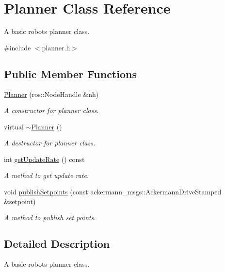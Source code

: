 \hypertarget{classPlanner}{}\section{Planner Class Reference}
\label{classPlanner}


A basic robot\textquotesingle{}s planner class.  




{\ttfamily \#include $<$planner.\+h$>$}

\subsection*{Public Member Functions}
\begin{DoxyCompactItemize}
\item 
\hyperlink{classPlanner_a32475baddd401921adb1aab3ab842210}{Planner} (ros\+::\+Node\+Handle \&nh)
\begin{DoxyCompactList}\small\item\em A constructor for planner class. \end{DoxyCompactList}\item 
\mbox{\label{classPlanner_aff801cbef97ac0431bd71a9850c8de33}} 
virtual \hyperlink{classPlanner_aff801cbef97ac0431bd71a9850c8de33}{$\sim$\+Planner} ()
\begin{DoxyCompactList}\small\item\em A destructor for planner class. \end{DoxyCompactList}\item 
int \hyperlink{classPlanner_a1245b622e15233cda941be45b76eb90f}{get\+Update\+Rate} () const
\begin{DoxyCompactList}\small\item\em A method to get update rate. \end{DoxyCompactList}\item 
void \hyperlink{classPlanner_a9fae9548d0458db1f30a1aa7d8b49acb}{publish\+Setpoints} (const ackermann\+\_\+msgs\+::\+Ackermann\+Drive\+Stamped \&setpoint)
\begin{DoxyCompactList}\small\item\em A method to publish set points. \end{DoxyCompactList}\end{DoxyCompactItemize}


\subsection{Detailed Description}
A basic robot\textquotesingle{}s planner class. 

